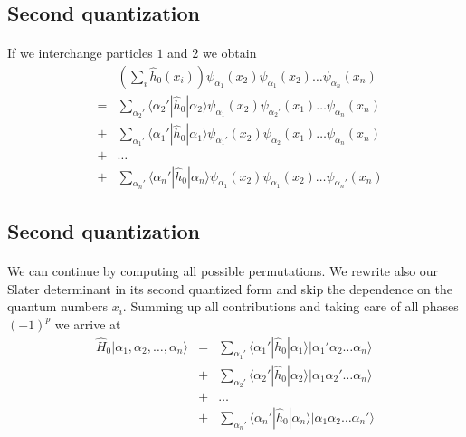 \documentclass[%
twoside,                 %
final,                   %
10pt]{article}
\begin{document}
\subsection*{Second quantization}

\paragraph{}
If we interchange particles $1$ and $2$  we obtain
\begin{eqnarray}
	&& \left( \sum_i \hat{h}_0(x_i) \right) \psi_{\alpha_1}(x_2)\psi_{\alpha_1}(x_2) \dots \psi_{\alpha_n}(x_n) \nonumber \\
	& =&\sum_{\alpha_2'} \langle \alpha_2'|\hat{h}_0|\alpha_2\rangle 
		\psi_{\alpha_1}(x_2)\psi_{\alpha_2'}(x_1) \dots \psi_{\alpha_n}(x_n) \nonumber \\
	&+&\sum_{\alpha_1'} \langle \alpha_1'|\hat{h}_0|\alpha_1\rangle
		\psi_{\alpha_1'}(x_2)\psi_{\alpha_2}(x_1) \dots \psi_{\alpha_n}(x_n) \nonumber \\
	&+& \dots \nonumber \\
	&+&\sum_{\alpha_n'} \langle \alpha_n'|\hat{h}_0|\alpha_n\rangle
		\psi_{\alpha_1}(x_2)\psi_{\alpha_1}(x_2) \dots \psi_{\alpha_n'}(x_n) \label{eq:2-27}
\end{eqnarray}




\subsection*{Second quantization}

\paragraph{}
We can continue by computing all possible permutations. 
We rewrite also our Slater determinant in its second quantized form and skip the dependence on the quantum numbers $x_i.$
Summing up all contributions and taking care of all phases
$(-1)^p$ we arrive at 
\begin{eqnarray}
	\hat{H}_0|\alpha_1,\alpha_2,\dots, \alpha_n\rangle &=& \sum_{\alpha_1'}\langle \alpha_1'|\hat{h}_0|\alpha_1\rangle
		|\alpha_1'\alpha_2 \dots \alpha_{n}\rangle \nonumber \\
	&+& \sum_{\alpha_2'} \langle \alpha_2'|\hat{h}_0|\alpha_2\rangle
		|\alpha_1\alpha_2' \dots \alpha_{n}\rangle \nonumber \\
	&+& \dots \nonumber \\
	&+& \sum_{\alpha_n'} \langle \alpha_n'|\hat{h}_0|\alpha_n\rangle
		|\alpha_1\alpha_2 \dots \alpha_{n}'\rangle \label{eq:2-28}
\end{eqnarray}
\end{document}
